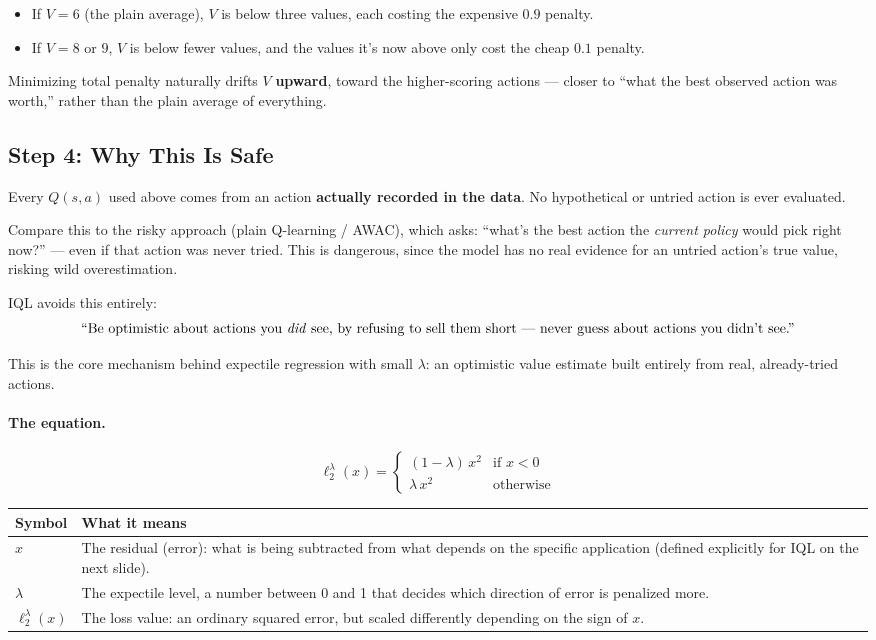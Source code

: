 \documentclass[11pt]{article}
\begin{document}
\begin{itemize}
    \item If $V = 6$ (the plain average), $V$ is below three values, each costing the expensive $0.9$ penalty.
    \item If $V = 8$ or $9$, $V$ is below fewer values, and the values it's now above only cost the cheap $0.1$ penalty.
\end{itemize}

Minimizing total penalty naturally drifts $V$ \textbf{upward}, toward the higher-scoring actions — closer to ``what the best observed action was worth,'' rather than the plain average of everything.

\subsection{Step 4: Why This Is Safe}

Every $Q(s,a)$ used above comes from an action \textbf{actually recorded in the data}. No hypothetical or untried action is ever evaluated.

Compare this to the risky approach (plain Q-learning / AWAC), which asks: ``what's the best action the \emph{current policy} would pick right now?'' — even if that action was never tried. This is dangerous, since the model has no real evidence for an untried action's true value, risking wild overestimation.

IQL avoids this entirely:
\[
\text{``Be optimistic about actions you \emph{did} see, by refusing to sell them short — never guess about actions you didn't see.''}
\]

This is the core mechanism behind expectile regression with small $\lambda$: an optimistic value estimate built entirely from real, already-tried actions.

\paragraph{The equation.}
$$\ell_2^\lambda(x) = \begin{cases}(1-\lambda)\,x^2 & \text{if } x<0\\ \lambda\, x^2 &
\text{otherwise}\end{cases}$$

\begin{center}
\begin{tabular}{@{}p{3.2cm}p{10.3cm}@{}}
\toprule
Symbol & What it means \\
\midrule
$x$ & The residual (error): what is being subtracted from what depends on the specific
application (defined explicitly for IQL on the next slide). \\
$\lambda$ & The expectile level, a number between 0 and 1 that decides which direction
of error is penalized more. \\
$\ell_2^\lambda(x)$ & The loss value: an ordinary squared error, but scaled differently
depending on the sign of $x$. \\
\bottomrule
\end{tabular}
\end{center}
\end{document}
